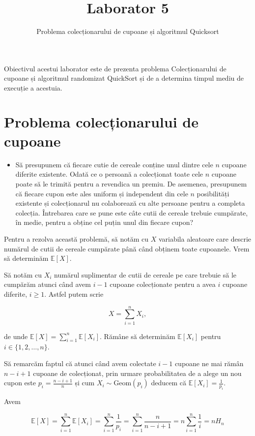 \documentclass[]{article}
\title{Laborator 5}
\subtitle{Problema colecționarului de cupoane și algoritmul Quicksort}
\author{}
\date{}
\newenvironment{frshaded*}{%
  \def\FrameCommand{\fboxrule=\FrameRule\fboxsep=\FrameSep \fcolorbox{framecolor}{shadecolor1}}%
  \MakeFramed {\advance\hsize-\width \FrameRestore}}%
{\endMakeFramed}
\newenvironment{rmdblock}[1]
  {\begin{frshaded*}
  \begin{itemize}
  \renewcommand{\labelitemi}{
    \raisebox{-.7\height}[0pt][0pt]{
      {\setkeys{Gin}{width=2em,keepaspectratio}\texttt{[image: images/icons/\#1]}}
    }
  }
  \item
  }
  {
  \end{itemize}
  \end{frshaded*}
  }
\newenvironment{rmdexercise}
  {\begin{rmdblock}{exercise}}
  {\end{rmdblock}}
\begin{document}
\maketitle

\thispagestyle{fancy}

Obiectivul acestui laborator este de prezenta problema Colecționarului
de cupoane și algoritmul randomizat QuickSort și de a determina timpul
mediu de execuție a acestuia.

\section{Problema colecționarului de
cupoane}\label{problema-colectionarului-de-cupoane}

\begin{rmdexercise}
Să presupunem că fiecare cutie de cereale conține unul dintre cele \(n\)
cupoane diferite existente. Odată ce o persoană a colecționat toate cele
\(n\) cupoane poate să le trimită pentru a revendica un premiu. De
asemenea, presupunem că fiecare cupon este ales uniform și independent
din cele \(n\) posibilități existente și colecționarul nu colaborează cu
alte persoane pentru a completa colecția. Întrebarea care se pune este
câte cutii de cereale trebuie cumpărate, în medie, pentru a obține cel
puțin unul din fiecare cupon?
\end{rmdexercise}

Pentru a rezolva această problemă, să notăm cu \(X\) variabila aleatoare
care descrie numărul de cutii de cereale cumpărate până când obținem
toate cupoanele. Vrem să determinăm \(\mathbb{E}[X]\).

Să notăm cu \(X_i\) numărul suplimentar de cutii de cereale pe care
trebuie să le cumpărăm atunci când avem \(i-1\) cupoane colecționate
pentru a avea \(i\) cupoane diferite, \(i\geq 1\). Astfel putem scrie

\[
  X = \sum_{i = 1}^{n}X_i,
\]

de unde \(\mathbb{E}[X] = \sum_{i = 1}^{n}\mathbb{E}[X_i]\). Rămâne să
determinăm \(\mathbb{E}[X_i]\) pentru \(i\in\{1,2,\ldots,n\}\).

Să remarcăm faptul că atunci când avem colectate \(i-1\) cupoane ne mai
rămân \(n-i+1\) cupoane de colecționat, prin urmare probabilitatea de a
alege un nou cupon este \(p_i=\frac{n-i+1}{n}\) și cum
\(X_i\sim\text{Geom}(p_i)\) deducem că
\(\mathbb{E}[X_i] = \frac{1}{p_i}\).

Avem

\[
  \mathbb{E}[X] = \sum_{i = 1}^{n}\mathbb{E}[X_i] = \sum_{i = 1}^{n}\frac{1}{p_i} = \sum_{i = 1}^{n}\frac{n}{n-i+1} = n\sum_{i = 1}^{n}\frac{1}{i} = nH_n
\]
\end{document}
